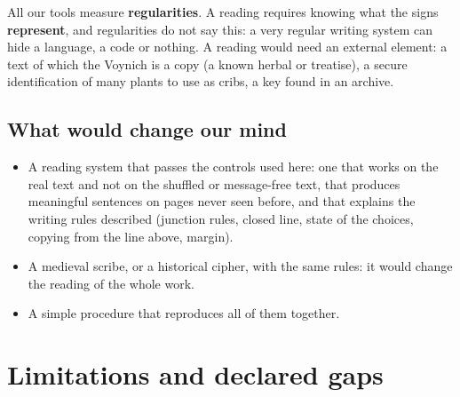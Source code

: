 All our tools measure \textbf{regularities}. A reading requires knowing what the signs \textbf{represent}, and
regularities do not say this: a very regular writing system can hide a language, a code or nothing. A reading would need
an external element: a text of which the Voynich is a copy (a known herbal or treatise), a secure identification of many
plants to use as cribs, a key found in an archive.

\subsection{What would change our mind}

\begin{itemize}
\item A reading system that passes the controls used here: one that works on the real text and not on the shuffled or
  message-free text, that produces meaningful sentences on pages never seen before, and that explains the writing rules
  described (junction rules, closed line, state of the choices, copying from the line above, margin).
\item A medieval scribe, or a historical cipher, with the same rules: it would change the reading of the whole work.
\item A simple procedure that reproduces all of them together.
\end{itemize}

\section{Limitations and declared gaps}
\label{sec:limits}

